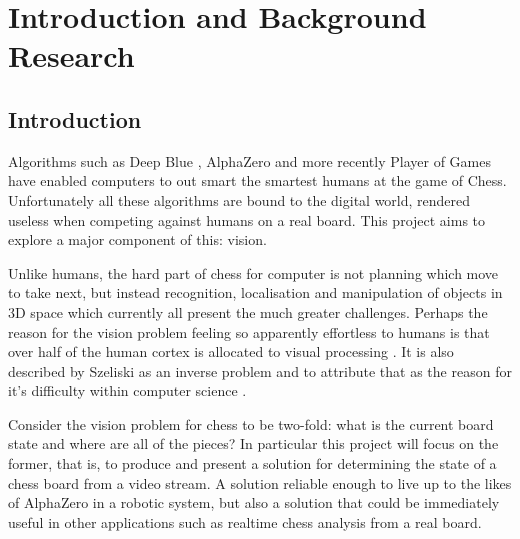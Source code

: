 \chapter{Introduction and Background Research}

\label{chapter1}

\section{Introduction}

Algorithms such as Deep Blue \cite{CAMPBELL200257}, AlphaZero \cite{silver2018general} and more recently Player of Games\cite{schmid2021player}
have enabled computers to out smart the smartest humans at the game of Chess.
Unfortunately all these algorithms are bound to the digital world, rendered useless when
competing against humans on a real board.  This project aims to explore a major component of this: vision.

Unlike humans, the hard part of chess for computer is not planning which move to take next, but instead recognition, 
localisation and manipulation of objects in 3D space which currently all present the much greater challenges.
Perhaps the reason for the vision problem feeling so apparently effortless to humans is that over half of the human cortex is allocated 
to visual processing \cite{snowden2012basic}.
It is also described by Szeliski as an inverse problem and to attribute that as the reason for it's difficulty
within computer science \cite{szeliski2011computer}.

Consider the vision problem for chess to be two-fold: what is the current board state and where are all of the pieces?  
In particular this project will focus on the former, that is, to produce and present a solution for determining the
state of a chess board from a video stream.  A solution reliable enough to live up to the likes of AlphaZero 
in a robotic system,
but also a solution that could be immediately useful in other applications such as realtime chess analysis from a real board.


